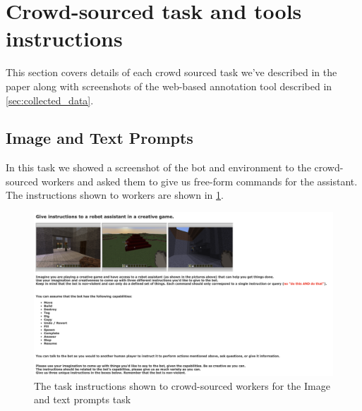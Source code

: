 \clearpage
\onecolumn

\section{Crowd-sourced task and tools instructions}
\label{sec:instructions}
This section covers details of each crowd sourced task we've described in the paper along with screenshots of the web-based annotation tool described in \ref{sec:collected_data}.

\subsection{Image and Text Prompts}
\label{sec:freegen_instructions}
In this task we showed a screenshot of the bot and environment to the crowd-sourced workers and asked them to give us free-form commands for the assistant.
The instructions shown to workers are shown in \ref{fig:freegen}.
\begin{figure}
	\includegraphics[width=\linewidth ]{figures/freegen.jpg}
	\caption{The task instructions shown to crowd-sourced workers for the Image and text prompts task\label{fig:freegen}}
\end{figure}


